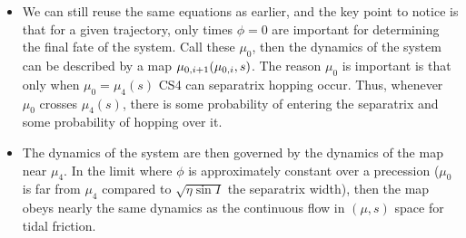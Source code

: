 \documentclass[11pt,
        usenames, %
        dvipsnames %
    ]{article}
\DeclarePairedDelimiter\p{\lparen}{\rparen}
\begin{document}
\begin{itemize}
    \item We can still reuse the same equations as earlier, and the key point to
        notice is that for a given trajectory, only times $\phi = 0$ are
        important for determining the final fate of the system. Call these
        $\mu_0$, then the dynamics of the system can be described by a map
        $\mu_{0, i + 1}\p*{\mu_{0, i}, s}$. The reason $\mu_0$ is important is
        that only when $\mu_0 = \mu_4(s)$ CS4 can separatrix hopping occur.
        Thus, whenever $\mu_0$ crosses $\mu_4(s)$, there is some probability of
        entering the separatrix and some probability of hopping over it.

    \item The dynamics of the system are then governed by the dynamics of the
        map near $\mu_4$. In the limit where $\phi$ is approximately constant
        over a precession ($\mu_0$ is far from $\mu_4$ compared to $\sqrt{\eta
        \sin I}$ the separatrix width), then the map obeys nearly the same
        dynamics as the continuous flow in $(\mu, s)$ space for tidal friction.


\end{itemize}
\end{document}
